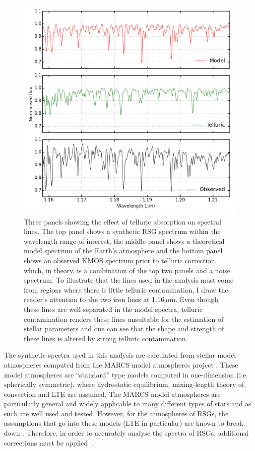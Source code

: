 \begin{figure}
 \centering
\includegraphics[width=\textwidth]{JAnal/tell-correction}
\caption[Three panels showing the effect of telluric absorption on spectral lines]{
Three panels showing the effect of telluric absorption on spectral lines.
The top panel shows a synthetic RSG spectrum within the wavelength range of interest,
the middle panel shows a theoretical model spectrum of the Earth's atmosphere and
the bottom panel shows an observed KMOS spectrum prior to telluric correction, which, in theory, is a combination of the top two panels and a noise spectrum.
To illustrate that the lines used in the analysis must come from regions where there is little telluric contamination, I draw the reader's attention to the two iron lines at 1.16\,$\mu$m.
Even though these lines are well separated in the model spectra, telluric contamination renders these lines unsuitable for the estimation of  stellar parameters and one can see that the shape and strength of these lines is altered by strong telluric contamination.
\label{fig:tell3pan}
         }
\end{figure}


The synthetic spectra used in this analysis are calculated from stellar model atmospheres computed from the MARCS model atmospheres project
\citep{1975A&A....42..407G,2008A&A...486..951G}.
These model atmospheres are ``standard'' type models computed in one-dimension (i.e. spherically symmetric),
where hydrostatic equilibrium, mixing-length theory of convection and LTE are assumed.
The MARCS model atmospheres are particularly general and widely applicable to many different types of stars and as such are well used and tested.
However, for the atmospheres of RSGs, the assumptions that go into these models (LTE in particular) are known to break down
\citep{2002AN....323..213F,2010ASPC..425..124P}.
Therefore, in order to accurately analyse the spectra of RSGs, additional corrections must be applied~\citep{2012ApJ...751..156B}.

